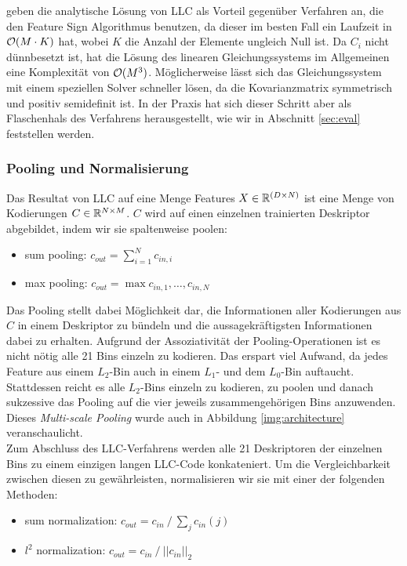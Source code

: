 \cite{wyylhg10} geben die analytische Lösung von LLC als Vorteil gegenüber Verfahren an, die den Feature Sign Algorithmus benutzen, da dieser im besten Fall ein Laufzeit in $\mathcal{O}(M \cdot K)$ hat, wobei $K$ die Anzahl der Elemente ungleich Null ist. Da $C_i$ nicht dünnbesetzt ist, hat die Lösung des linearen Gleichungssystems im Allgemeinen eine Komplexität von $\mathcal{O}(M^3)$. Möglicherweise lässt sich das Gleichungssystem mit einem speziellen Solver schneller lösen, da die Kovarianzmatrix symmetrisch und positiv semidefinit ist. In der Praxis hat sich dieser Schritt aber als Flaschenhals des Verfahrens herausgestellt, wie wir in Abschnitt \ref{sec:eval} feststellen werden.

\subsubsection{Pooling und Normalisierung}

Das Resultat von LLC auf eine Menge Features $X \in \mathbb{R}^{(D \times N)}$ ist eine Menge von Kodierungen $C \in \mathbb{R}^{N \times M}$. $C$ wird auf einen einzelnen trainierten Deskriptor abgebildet, indem wir sie spaltenweise poolen:

\begin{itemize}
	\item sum pooling: $c_{out} = \sum_{i=1}^{N} c_{in, i}$
	\item max pooling: $c_{out} = \max{c_{in, 1}, \dots, c_{in, N}}$
\end{itemize} 

Das Pooling stellt dabei Möglichkeit dar, die Informationen aller Kodierungen aus $C$ in einem Deskriptor zu bündeln und die aussagekräftigsten Informationen dabei zu erhalten. Aufgrund der Assoziativität der Pooling-Operationen ist es nicht nötig alle 21 Bins einzeln zu kodieren. Das erspart viel Aufwand, da jedes Feature aus einem $L_2$-Bin auch in einem $L_1$- und dem $L_0$-Bin auftaucht. Stattdessen reicht es alle $L_2$-Bins einzeln zu kodieren, zu poolen und danach sukzessive das Pooling auf die vier jeweils zusammengehörigen Bins anzuwenden. Dieses \emph{Multi-scale Pooling} wurde auch in Abbildung \ref{img:architecture} veranschaulicht. \\
Zum Abschluss des LLC-Verfahrens werden alle 21 Deskriptoren der einzelnen Bins zu einem einzigen langen LLC-Code konkateniert. Um die Vergleichbarkeit zwischen diesen zu gewährleisten, normalisieren wir sie mit einer der folgenden Methoden:

\begin{itemize}
	\item sum normalization: $c_{out} = c_{in}\: / \: \sum_j c_{in}(j)$
	\item $l^2$ normalization: $c_{out} = c_{in}\: / \: ||c_{in}||_2$
\end{itemize}

